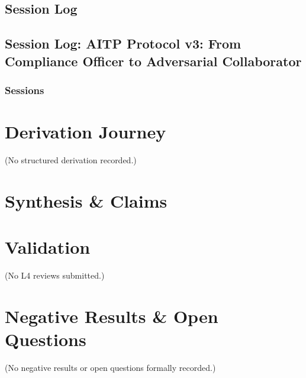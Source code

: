 \documentclass[11pt,a4paper]{article}
\begin{document}
\subsection*{Session Log}
\subsection*{Session Log: AITP Protocol v3: From Compliance Officer to Adversarial Collaborator}

\subsubsection*{Sessions}



\section{Derivation Journey}

\noindent (No structured derivation recorded.)

\section{Synthesis \& Claims}

\section{Validation}

\noindent (No L4 reviews submitted.)

\section{Negative Results \& Open Questions}

\noindent (No negative results or open questions formally recorded.)
\end{document}
